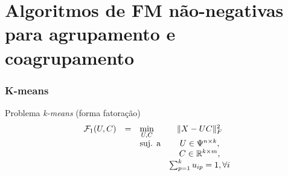 \documentclass[10pt]{beamer}
\DeclarePairedDelimiter\norm{\lVert}{\rVert}
\begin{document}

\section{Algoritmos de FM não-negativas para agrupamento e coagrupamento}






\begin{frame}
  \frametitle{K-means}

  \begin{block}{Problema \textit{k-means} (forma fatoração)}
    \begin{equation}
        \begin{array}{lclcl}
            \displaystyle \mathcal{F}_1(U, C) & = & \displaystyle \min_{U, C} & \norm{X - UC}^{2}_{F} \\
                                              &   & \text{suj. a} & U \in \Psi^{n \times k}, \\
                                              &   & & C \in \mathbb{R}^{k \times m}, \\
                                              &   & & \sum_{p=1}^{k} u_{ip} = 1, \forall i
        \end{array} \nonumber
    \end{equation}
  \end{block}
\end{frame}
\end{document}
